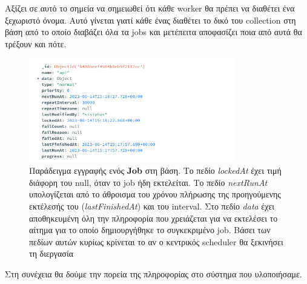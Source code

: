 Αξίζει σε αυτό το σημεία να σημειωθεί ότι κάθε worker θα πρέπει να διαθέτει ένα ξεχωριστό όνομα.
Αυτό γίνεται γιατί κάθε ένας διαθέτει το δικό του collection στη βάση από το οποίο διαβάζει όλα τα jobs
και μετέπειτα αποφασίζει ποια από αυτά θα τρέξουν και πότε.

\begin{figure}[!ht]
	\centering
	\includegraphics[width=0.8\textwidth]{./images/chapter4/sample_job_document.png}
	\caption[Παράδειγμα εγγραφής ενός \textbf{Job} στη βάση]{Παράδειγμα εγγραφής ενός \textbf{Job} στη βάση. Tο πεδίο \textit{lockedAt} έχει τιμή διάφορη του null, όταν το job ήδη εκτελείται.
		Το πεδίο \textit{nextRunAt} υπολογίζεται από το άθροισμα του χρόνου πλήρωσης της προηγούμενης εκτέλεσής του (\textit{lastFinishedAt}) και του interval. Στο πεδίο \textit{data}
		έχει αποθηκευμένη όλη την πληροφορία που χρειάζεται για να εκτελέσει το αίτημα για το οποίο δημιουργήθηκε το συγκεκριμένο job. Βάσει των πεδίων αυτών κυρίως κρίνεται το αν ο
		κεντρικός scheduler θα ξεκινήσει τη διεργασία}
	\label{fig:sample_job_document}
\end{figure}

Στη συνέχεια θα δούμε την πορεία της πληροφορίας στο σύστημα που υλοποιήσαμε.

